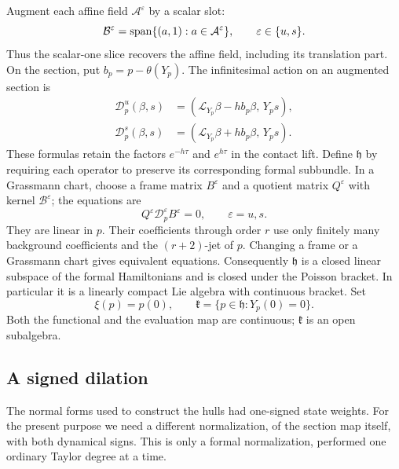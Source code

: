 Augment each affine field $\mathcal A^\varepsilon$ by a scalar slot:
\[
 \mathcal B^\varepsilon
   =\operatorname{span}\{(a,1):a\in\mathcal A^\varepsilon\},
 \qquad \varepsilon\in\{u,s\}.
\]
Thus the scalar-one slice recovers the affine field, including its
translation part.  On the section, put $b_p=p-\theta(Y_p)$.
The infinitesimal action on an augmented section is
\begin{align}
 \mathcal D_p^u(\beta,s)
     &=(\mathcal L_{Y_p}\beta-hb_p\beta,\,Y_ps),
       \label{sym:augmented-action-u}\\
 \mathcal D_p^s(\beta,s)
     &=(\mathcal L_{Y_p}\beta+hb_p\beta,\,Y_ps).
       \label{sym:augmented-action-s}
\end{align}
These formulas retain the factors $e^{-h\tau}$ and $e^{h\tau}$ in the
contact lift.  Define $\mathfrak h$ by requiring each operator to
preserve its corresponding formal subbundle.  In a Grassmann chart,
choose a frame matrix $B^\varepsilon$ and a quotient matrix
$Q^\varepsilon$ with kernel $\mathcal B^\varepsilon$; the equations are
\begin{equation}
 \label{sym:linear-equations}
 Q^\varepsilon\mathcal D_p^\varepsilon B^\varepsilon=0,
 \qquad \varepsilon=u,s.
\end{equation}
They are linear in $p$.  Their coefficients through order $r$ use only
finitely many background coefficients and the $(r+2)$-jet of $p$.
Changing a frame or a Grassmann chart gives equivalent equations.
Consequently $\mathfrak h$ is a closed linear subspace of the formal
Hamiltonians and is closed under the Poisson bracket.  In particular it
is a linearly compact Lie algebra with continuous bracket.  Set
\begin{equation}
 \label{sym:isotropy-functional}
 \xi(p)=p(0),\qquad
 \mathfrak k=\{p\in\mathfrak h:Y_p(0)=0\}.
\end{equation}
Both the functional and the evaluation map are continuous;
$\mathfrak k$ is an open subalgebra.

\subsection{A signed dilation}

The normal forms used to construct the hulls had one-signed state
weights.  For the present purpose we need a different normalization,
of the section map itself, with both dynamical signs.  This is only a
formal normalization, performed one ordinary Taylor degree at a time.

